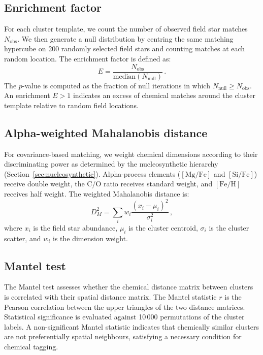 \documentclass[fleqn,usenatbib]{mnras}
\newcommand{\feh}{$\mathrm{[Fe/H]}$\xspace}
\newcommand{\mgfe}{$\mathrm{[Mg/Fe]}$\xspace}
\newcommand{\sife}{$\mathrm{[Si/Fe]}$\xspace}
\newcommand{\co}{C/O\xspace}
\begin{document}
\subsection{Enrichment factor}
\label{sec:enrichment}

For each cluster template, we count the number of observed field star matches $N_{\mathrm{obs}}$.
We then generate a null distribution by centring the same matching hypercube on 200 randomly selected field stars and counting matches at each random location.
The enrichment factor is defined as:
\begin{equation}
E = \frac{N_{\mathrm{obs}}}{\mathrm{median}(N_{\mathrm{null}})} \,.
\label{eq:enrichment}
\end{equation}
The $p$-value is computed as the fraction of null iterations in which $N_{\mathrm{null}} \geq N_{\mathrm{obs}}$.
An enrichment $E > 1$ indicates an excess of chemical matches around the cluster template relative to random field locations.

\subsection{Alpha-weighted Mahalanobis distance}
\label{sec:mahalanobis}

For covariance-based matching, we weight chemical dimensions according to their discriminating power as determined by the nucleosynthetic hierarchy (Section~\ref{sec:nucleosynthetic}).
Alpha-process elements (\mgfe and \sife) receive double weight, the \co ratio receives standard weight, and \feh receives half weight.
The weighted Mahalanobis distance is:
\begin{equation}
D_M^2 = \sum_i w_i \frac{(x_i - \mu_i)^2}{\sigma_i^2} \,,
\label{eq:mahalanobis}
\end{equation}
where $x_i$ is the field star abundance, $\mu_i$ is the cluster centroid, $\sigma_i$ is the cluster scatter, and $w_i$ is the dimension weight.

\subsection{Mantel test}
\label{sec:mantel}

The Mantel test \citep{Mantel1967} assesses whether the chemical distance matrix between clusters is correlated with their spatial distance matrix.
The Mantel statistic $r$ is the Pearson correlation between the upper triangles of the two distance matrices.
Statistical significance is evaluated against 10\,000 permutations of the cluster labels.
A non-significant Mantel statistic indicates that chemically similar clusters are not preferentially spatial neighbours, satisfying a necessary condition for chemical tagging.
\end{document}
